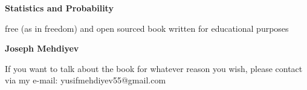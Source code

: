 \begin{titlepage}
    \begin{center}
        \vspace*{1cm}
        \Huge
        \textbf{Statistics and Probability}
        
        \vspace*{0.5cm}
        \LARGE
        free (as in freedom) and open sourced book written for educational purposes

        \vspace*{1.5cm}

        \textbf{Joseph Mehdiyev}

        \vfill
        
        \small
        If you want to talk about the book for whatever reason you wish, please contact via my e-mail: yusifmehdiyev55@gmail.com
    \end{center}
\end{titlepage}
